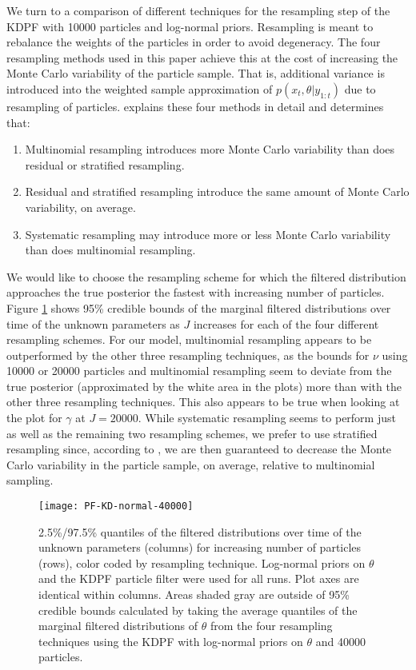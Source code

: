 \documentclass{elsarticle}
\begin{document}
We turn to a comparison of different techniques for the resampling step of the KDPF with 10000 particles and log-normal priors.  Resampling is meant to rebalance the weights of the particles in order to avoid degeneracy. The four resampling methods used in this paper achieve this at the cost of increasing the Monte Carlo variability of the particle sample. That is, additional variance is introduced into the weighted sample approximation of $p(x_t,\theta|y_{1:t})$ due to resampling of particles. \citet{Douc:Capp:Moul:comp:2005} explains these four methods in detail and determines that:

\begin{enumerate}
\item Multinomial resampling introduces more Monte Carlo variability than does residual or stratified resampling.
\item Residual and stratified resampling introduce the same amount of Monte Carlo variability, on average.
\item Systematic resampling may introduce more or less Monte Carlo variability than does multinomial resampling.
\end{enumerate}

We would like to choose the resampling scheme for which the filtered distribution approaches the true posterior the fastest with increasing number of particles. Figure \ref{fig:resamp} shows 95\% credible bounds of the marginal filtered distributions over time of the unknown parameters as $J$ increases for each of the four different resampling schemes. For our model, multinomial resampling appears to be outperformed by the other three resampling techniques, as the bounds for $\nu$ using 10000 or 20000 particles and multinomial resampling seem to deviate from the true posterior (approximated by the white area in the plots) more than with the other three resampling techniques. This also appears to be true when looking at the plot for $\gamma$ at $J = 20000$. While systematic resampling seems to perform just as well as the remaining two resampling schemes, we prefer to use stratified resampling since, according to \cite{Douc:Capp:Moul:comp:2005}, we are then guaranteed to decrease the Monte Carlo variability in the particle sample, on average, relative to multinomial sampling.

\begin{figure}
\centering
\texttt{[image: PF-KD-normal-40000]}
\caption{2.5\%/97.5\% quantiles of the filtered distributions over time of the unknown parameters (columns) for increasing number of particles (rows), color coded by resampling technique. Log-normal priors on $\theta$ and the KDPF particle filter were used for all runs.  Plot axes are identical within columns. Areas shaded gray are outside of 95\% credible bounds calculated by taking the average quantiles of the marginal filtered distributions of $\theta$ from the four resampling techniques using the KDPF with log-normal priors on $\theta$ and 40000 particles.} \label{fig:resamp}
\end{figure}
\end{document}
